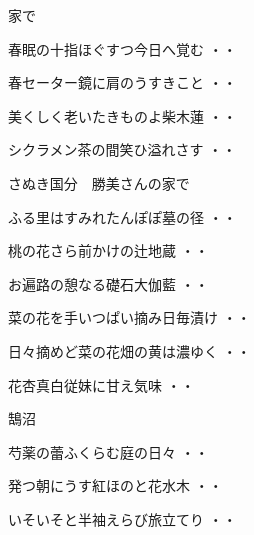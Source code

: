 \vspace{0.4cm}
家で
\begin{shiika}春眠の十指ほぐすつ今日へ覚む
\hfill{・・}\end{shiika}
\vspace{0.4cm}
\begin{shiika}春セーター鏡に肩のうすきこと
\hfill{・・}\end{shiika}
\vspace{0.4cm}
\begin{shiika}美くしく老いたきものよ柴木蓮
\hfill{・・}\end{shiika}
\vspace{0.4cm}
\begin{shiika}シクラメン茶の間笑ひ溢れさす
\hfill{・・}\end{shiika}
\vspace{0.4cm}
さぬき国分　勝美さんの家で
\begin{shiika}ふる里はすみれたんぽぽ墓の径
\hfill{・・}\end{shiika}
\begin{shiika}桃の花さら前かけの辻地蔵
\hfill{・・}\end{shiika}
\begin{shiika}お遍路の憩なる礎石大伽藍
\hfill{・・}\end{shiika}
\begin{shiika}菜の花を手いつぱい摘み日毎漬け
\hfill{・・}\end{shiika}
\begin{shiika}日々摘めど菜の花畑の黄は濃ゆく
\hfill{・・}\end{shiika}
\begin{shiika}花杏真白従妹に甘え気味
\hfill{・・}\end{shiika}
\vspace{0.4cm}
鵠沼
\begin{shiika}芍薬の蕾ふくらむ庭の日々
\hfill{・・}\end{shiika}
\begin{shiika}発つ朝にうす紅ほのと花水木
\hfill{・・}\end{shiika}
\begin{shiika}いそいそと半袖えらび旅立てり
\hfill{・・}\end{shiika}
